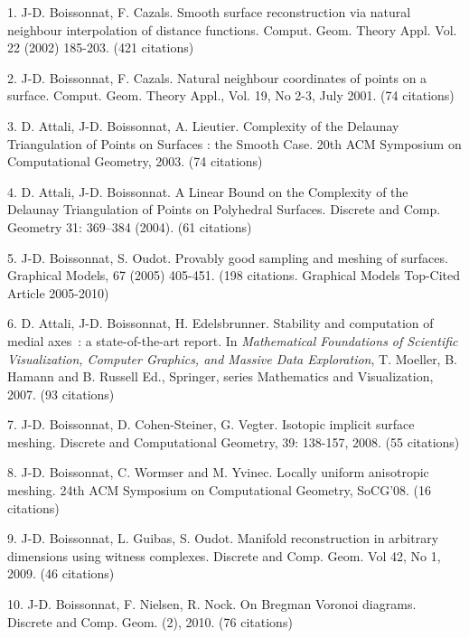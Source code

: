 1. J-D. Boissonnat, F. Cazals. Smooth surface reconstruction via natural neighbour interpolation of
distance functions.  Comput. Geom. Theory Appl. Vol. 22 (2002) 185-203.  (421 citations)

2.  J-D. Boissonnat, F. Cazals. Natural neighbour coordinates of points on a surface.  
Comput. Geom. Theory Appl., Vol. 19, No 2-3, July 2001. (74 citations)

3. D. Attali, J-D. Boissonnat, A. Lieutier. Complexity of the Delaunay Triangulation of Points on Surfaces : the 
Smooth Case. 20th  ACM      Symposium on Computational Geometry, 2003. 
(74 citations)

4. D. Attali, J-D. Boissonnat. A Linear Bound on the Complexity of the Delaunay Triangulation of Points on Polyhedral Surfaces.  Discrete and Comp. Geometry 31: 369--384
(2004). (61 citations)

5. J-D. Boissonnat, S. Oudot. Provably good sampling and meshing of surfaces. Graphical Models, 67 (2005) 405-451. (198 citations. Graphical Models Top-Cited Article 2005-2010)

6. D. Attali, J-D. Boissonnat, H. Edelsbrunner. Stability and computation of medial axes~: a state-of-the-art report.
In {\em Mathematical Foundations of Scientific Visualization,
Computer Graphics, and Massive Data Exploration},
T. Moeller,   B. Hamann and B. Russell Ed.,
Springer, series Mathematics and Visualization, 2007. (93 citations)

7. J-D. Boissonnat, D. Cohen-Steiner, G. Vegter. Isotopic implicit surface meshing.  Discrete and Computational Geometry,  39: 138-157,  2008. (55 citations)%

8. J-D. Boissonnat, C. Wormser and M. Yvinec. Locally uniform anisotropic meshing. 
24th ACM Symposium on Computational Geometry, SoCG'08.
(16 citations)

9. J-D. Boissonnat, L. Guibas, S. Oudot. Manifold reconstruction in arbitrary dimensions using witness complexes.
Discrete and Comp. Geom. Vol 42, No 1, 2009. (46 citations)


10. J-D. Boissonnat, F. Nielsen, R. Nock. On Bregman Voronoi diagrams.
Discrete and Comp. Geom. (2), 2010. (76 citations)%

